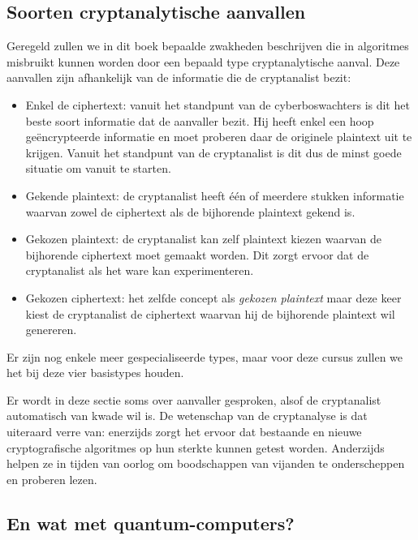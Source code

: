 \documentclass[
  10pt,
  dutch,
  paper=a4,
  ,captions=tableheading
]{scrbook}
\providecommand{\tightlist}{%
  \setlength{\itemsep}{0pt}\setlength{\parskip}{0pt}}
\begin{document}
\subsection{Soorten cryptanalytische
aanvallen}\label{soorten-cryptanalytische-aanvallen}

Geregeld zullen we in dit boek bepaalde zwakheden beschrijven die in
algoritmes misbruikt kunnen worden door een bepaald type
cryptanalytische aanval. Deze aanvallen zijn afhankelijk van de
informatie die de cryptanalist bezit:

\begin{itemize}
\tightlist
\item
  Enkel de ciphertext: vanuit het standpunt van de cyberboswachters is
  dit het beste soort informatie dat de aanvaller bezit. Hij heeft enkel
  een hoop geëncrypteerde informatie en moet proberen daar de originele
  plaintext uit te krijgen. Vanuit het standpunt van de cryptanalist is
  dit dus de minst goede situatie om vanuit te starten.
\item
  Gekende plaintext: de cryptanalist heeft één of meerdere stukken
  informatie waarvan zowel de ciphertext als de bijhorende plaintext
  gekend is.
\item
  Gekozen plaintext: de cryptanalist kan zelf plaintext kiezen waarvan
  de bijhorende ciphertext moet gemaakt worden. Dit zorgt ervoor dat de
  cryptanalist als het ware kan experimenteren.
\item
  Gekozen ciphertext: het zelfde concept als \emph{gekozen plaintext}
  maar deze keer kiest de cryptanalist de ciphertext waarvan hij de
  bijhorende plaintext wil genereren.
\end{itemize}

Er zijn nog enkele meer gespecialiseerde types, maar voor deze cursus
zullen we het bij deze vier basistypes houden.

\begin{noteblock}
Er wordt in deze sectie soms over aanvaller gesproken, alsof de
cryptanalist automatisch van kwade wil is. De wetenschap van de
cryptanalyse is dat uiteraard verre van: enerzijds zorgt het ervoor dat
bestaande en nieuwe cryptografische algoritmes op hun sterkte kunnen
getest worden. Anderzijds helpen ze in tijden van oorlog om boodschappen
van vijanden te onderscheppen en proberen lezen.
\end{noteblock}

\subsection{En wat met
quantum-computers?}\label{en-wat-met-quantum-computers}
\end{document}
